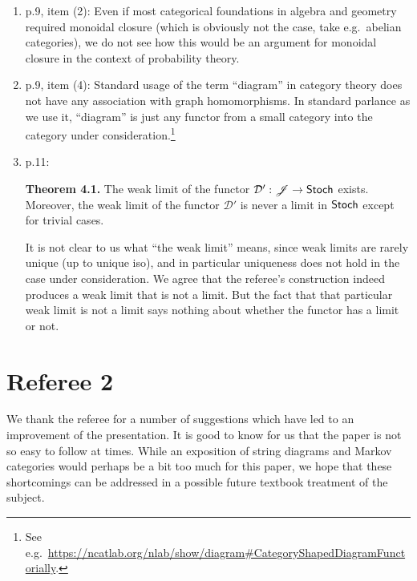 \documentclass[11pt]{article}
\begin{document}
\begin{enumerate}[resume,label=(\alph*).]
	\item p.9, item (2): Even if most categorical foundations in algebra and geometry required monoidal closure (which is obviously not the case, take e.g.~abelian categories), we do not see how this would be an argument for monoidal closure in the context of probability theory.
	\item p.9, item (4): Standard usage of the term ``diagram'' in category theory does not have any association with graph homomorphisms. In standard parlance as we use it, ``diagram'' is just any functor from a small category into the category under consideration.\footnote{See e.g.~\href{https://ncatlab.org/nlab/show/diagram\#CategoryShapedDiagramFunctorially}{https://ncatlab.org/nlab/show/diagram\#CategoryShapedDiagramFunctorially}.}
	\item p.11:
		\begin{displayquote}
			\textbf{Theorem 4.1.} The weak limit of the functor $\mathcal{D}' : \mathscr{J} \to \operatorname{\mathsf{Stoch}}$ exists. Moreover, the weak limit of the functor $\mathcal{D}'$ is never a limit in $\operatorname{\mathsf{Stoch}}$ except for trivial cases.
		\end{displayquote}
		It is not clear to us what ``the weak limit'' means, since weak limits are rarely unique (up to unique iso), and in particular uniqueness does not hold in the case under consideration. We agree that the referee's construction indeed produces a weak limit that is not a limit. But the fact that that particular weak limit is not a limit says nothing about whether the functor has a limit or not.
\end{enumerate}

\section*{Referee 2}

We thank the referee for a number of suggestions which have led to an improvement of the presentation. It is good to know for us that the paper is not so easy to follow at times. While an exposition of string diagrams and Markov categories would perhaps be a bit too much for this paper, we hope that these shortcomings can be addressed in a possible future textbook treatment of the subject.

%
%
\end{document}
